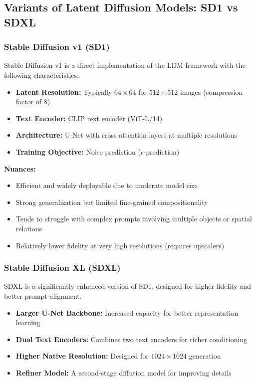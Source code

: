 \subsection{Variants of Latent Diffusion Models: SD1 vs SDXL}

\subsubsection{Stable Diffusion v1 (SD1)}

Stable Diffusion v1 is a direct implementation of the LDM framework with the following characteristics:

\begin{itemize}
    \item \textbf{Latent Resolution:} Typically $64 \times 64$ for $512 \times 512$ images (compression factor of 8)
    \item \textbf{Text Encoder:} CLIP text encoder (ViT-L/14)
    \item \textbf{Architecture:} U-Net with cross-attention layers at multiple resolutions
    \item \textbf{Training Objective:} Noise prediction ($\epsilon$-prediction)
\end{itemize}

\vspace{0.5em}
\noindent
\textbf{Nuances:}
\begin{itemize}
    \item Efficient and widely deployable due to moderate model size
    \item Strong generalization but limited fine-grained compositionality
    \item Tends to struggle with complex prompts involving multiple objects or spatial relations
    \item Relatively lower fidelity at very high resolutions (requires upscalers)
\end{itemize}

\subsubsection{Stable Diffusion XL (SDXL)}

SDXL is a significantly enhanced version of SD1, designed for higher fidelity and better prompt alignment.

\begin{itemize}
    \item \textbf{Larger U-Net Backbone:} Increased capacity for better representation learning
    \item \textbf{Dual Text Encoders:} Combines two text encoders for richer conditioning
    \item \textbf{Higher Native Resolution:} Designed for $1024 \times 1024$ generation
    \item \textbf{Refiner Model:} A second-stage diffusion model for improving details
\end{itemize}

